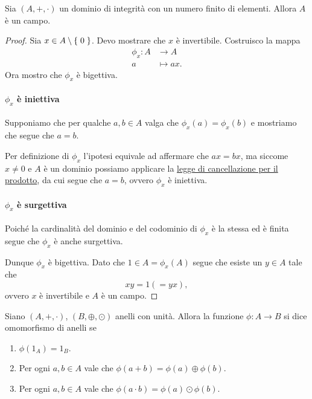 \begin{proposition}
    Sia $(A, +, \cdot)$ un dominio di integrità con un numero finito di elementi. Allora $A$ è un campo.
\end{proposition}
\begin{proof}
    Sia $x \in A \setminus \left\{\;0\;\right\}$. Devo mostrare che $x$ è invertibile.
    Costruisco la mappa \begin{align*}
        \phi_x : A &\to A\\
        a &\mapsto ax.
    \end{align*} Ora mostro che $\phi_x$ è bigettiva.

    \paragraph{$\phi_x$ è iniettiva} Supponiamo che per qualche $a, b \in A$ valga che $\phi_x(a) = \phi_x(b)$ e mostriamo che segue che $a = b$.

    Per definizione di $\phi_x$ l'ipotesi equivale ad affermare che $ax = bx$, ma siccome $x \neq 0$ e $A$ è un dominio possiamo applicare la \hyperref[cor:canc_prod_dominio]{legge di cancellazione per il prodotto}, da cui segue che $a = b$, ovvero $\phi_x$ è iniettiva.

    \paragraph{$\phi_x$ è surgettiva} Poiché la cardinalità del dominio e del codominio di $\phi_x$ è la stessa ed è finita segue che $\phi_x$ è anche surgettiva.

    Dunque $\phi_x$ è bigettiva. Dato che $1 \in A = \phi_x(A)$ segue che esiste un $y \in A$ tale che \[
        xy = 1 (= yx), 
    \] ovvero $x$ è invertibile e $A$ è un campo.
\end{proof}

\begin{definition}
     \label{def:omo_anelli}
    Siano $(A, +, \cdot)$, $(B, \oplus, \odot)$ anelli con unità. Allora la funzione $\phi : A \to B$ si dice omomorfismo di anelli se \begin{enumerate}[label={(\roman*)}]
        \item $\phi(1_A) = 1_B$.
        \item Per ogni $a, b \in A$ vale che $\phi(a + b) = \phi(a) \oplus \phi(b)$.
        \item Per ogni $a, b \in A$ vale che $\phi(a \cdot b) = \phi(a) \odot \phi(b)$.
    \end{enumerate}
\end{definition}